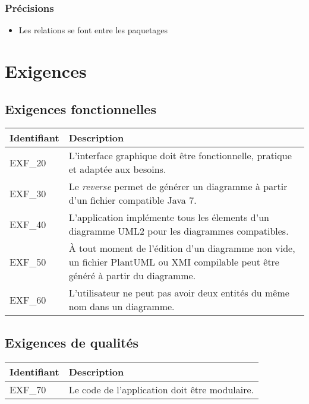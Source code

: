 \documentclass[hidelinks, 10pt,a4paper]{article}
\begin{document}
\subsubsection{Précisions}
\begin{itemize}
 \item Les relations se font entre les paquetages
\end{itemize}

\section{Exigences}
  \subsection{Exigences fonctionnelles}
    \begin{center}
	\begin{tabular}{|l|p{10cm}|}
	    \hline{\textbf{Identifiant}} & {\textbf{Description}}\\\hline
	    {EXF\_20} & {L’interface graphique doit être fonctionnelle, pratique et adaptée aux besoins.}\\\hline
	    {EXF\_30} & {Le \textit{reverse} permet de générer un diagramme à partir d'un fichier compatible Java 7.}\\\hline
	    {EXF\_40} & {L’application implémente tous les élements d’un diagramme UML2 pour les diagrammes compatibles.}\\\hline
	    {EXF\_50} & {À tout moment de l’édition d’un diagramme non vide, un fichier PlantUML ou XMI compilable peut être généré à partir du diagramme.}\\\hline
	    {EXF\_60} & {L’utilisateur ne peut pas avoir deux entités du même nom dans un diagramme.}\\\hline
	\end{tabular}
    \end{center}
  \subsection{Exigences de qualités}
    \begin{center}
      \begin{tabular}{|l|p{10cm}|}
	\hline{\textbf{Identifiant}} & {\textbf{Description}}\\\hline
	{EXF\_70} & {Le code de l’application doit être modulaire.}\\\hline
      \end{tabular}
    \end{center}
\end{document}
